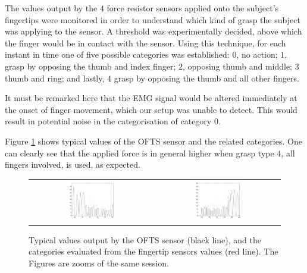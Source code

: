 The values output by the $4$ force resistor sensors applied onto the
subject's fingertips were monitored in order to understand which kind
of grasp the subject was applying to the sensor. A threshold was
experimentally decided, above which the finger would be in contact
with the sensor. Using this technique, for each instant in time one of
five possible categories was established: $0$, no action; $1$,
grasp by opposing the thumb and index finger; $2$, opposing thumb and
middle; $3$ thumb and ring; and lastly, $4$ grasp by opposing the
thumb and all other fingers.

It must be remarked here that the EMG signal would be altered
immediately at the onset of finger movement, which our setup was
unable to detect. This would result in potential noise in the
categorisation of category $0$.

Figure \ref{fig:targets} shows typical values of the OFTS sensor and
the related categories. One can clearly see that the applied force is
in general higher when grasp type $4$, all fingers involved, is used,
as expected.

\begin{figure}[!ht] \centering
  \begin{tabular}{cc}
    \includegraphics[width=0.45\textwidth]{figs/targets_zoom1} &
    \includegraphics[width=0.45\textwidth]{figs/targets_zoom2} \\
  \end{tabular}
  \caption{Typical values output by the OFTS sensor (black line), and the
    categories evaluated from the fingertip sensors values (red
    line). The Figures are zooms of the same session.}
  \label{fig:targets}
\end{figure}
